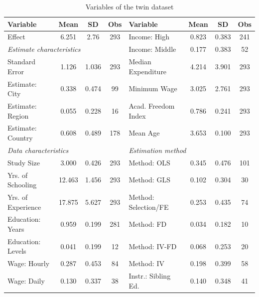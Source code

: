 \begin{table}[!htbp]
\centering
\scriptsize
\singlespace
\caption{Variables of the twin dataset}
\label{tab:twins_new_vars}
\begin{tabular}
{
@{\hskip\tabcolsep\extracolsep}
l
*{3}{c}
|
l
*{3}{c}
@{}
}
\toprule
    Variable & Mean & SD & Obs & Variable & Mean & SD & Obs \\
\midrule
Effect                         & 6.251  & 2.76   & 293  & Income: High              & 0.823  & 0.383  & 241  \\
\multicolumn{3}{l}{\textit{\hspace{0.1cm}Estimate characteristics}} & & Income: Middle           & 0.177  & 0.383  & 52   \\
Standard Error                 & 1.126  & 1.036  & 293  & Median Expenditure        & 4.214  & 3.901  & 293  \\
Estimate: City                 & 0.338  & 0.474  & 99   & Minimum Wage              & 3.025  & 2.761  & 293  \\
Estimate: Region               & 0.055  & 0.228  & 16   & Acad. Freedom Index       & 0.786  & 0.241  & 293  \\
Estimate: Country              & 0.608  & 0.489  & 178  & Mean Age                  & 3.653  & 0.100  & 293  \\
\multicolumn{3}{l}{\textit{\hspace{0.1cm}Data characteristics}} & & \multicolumn{3}{l}{\textit{\hspace{0.1cm}Estimation method}} & \\
Study Size                     & 3.000  & 0.426  & 293  & Method: OLS               & 0.345  & 0.476  & 101  \\
Yrs. of Schooling              & 12.463 & 1.456  & 293  & Method: GLS               & 0.102  & 0.304  & 30   \\
Yrs. of Experience             & 17.875 & 5.627  & 293  & Method: Selection/FE      & 0.253  & 0.435  & 74   \\
Education: Years               & 0.959  & 0.199  & 281  & Method: FD                & 0.034  & 0.182  & 10   \\
Education: Levels              & 0.041  & 0.199  & 12   & Method: IV-FD             & 0.068  & 0.253  & 20   \\
Wage: Hourly                  & 0.287  & 0.453  & 84   & Method: IV                & 0.198  & 0.399  & 58   \\
Wage: Daily                   & 0.130  & 0.337  & 38   & Instr.: Sibling Ed.       & 0.140  & 0.348  & 41   \\

\end{tabular}
\end{table}
